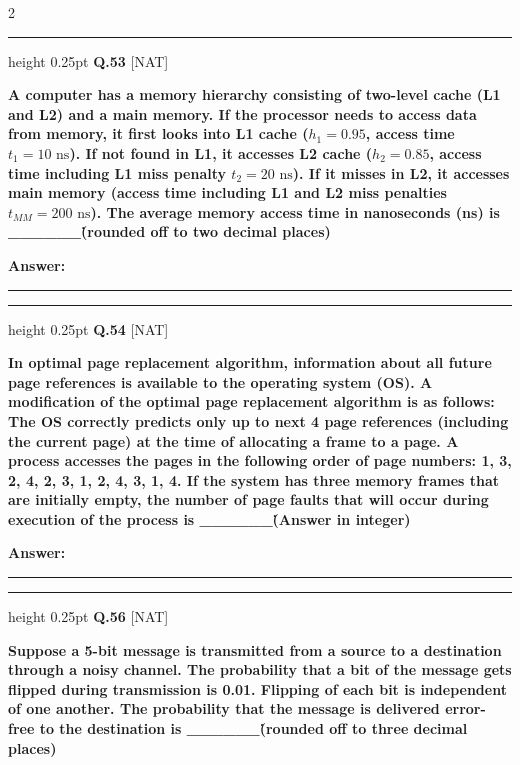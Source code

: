 \documentclass[a4paper,10pt,twoside]{article}
\begin{document}
\begin{multicols}{2}
\par\vspace{6pt}\hrule height 0.25pt\vspace{6pt}
\noindent\textbf{Q.53} \hfill {\footnotesize\textsf{[NAT]}}
\par\vspace{2pt}
{\bfseries A computer has a memory hierarchy consisting of two-level cache (L1 and L2) and a main memory. If the processor needs to access data from memory, it first looks into L1 cache ($h_1 = 0.95$, access time $t_1 = 10\text{ ns}$). If not found in L1, it accesses L2 cache ($h_2 = 0.85$, access time including L1 miss penalty $t_2 = 20\text{ ns}$). If it misses in L2, it accesses main memory (access time including L1 and L2 miss penalties $t_{MM} = 200\text{ ns}$). The average memory access time in nanoseconds (ns) is \_\_\_\_\_\_\. (rounded off to two decimal places) \par}
\par\vspace{3pt}\noindent\textbf{Answer:} \rule{3.2cm}{0.4pt}
\par\vspace{6pt}\hrule height 0.25pt\vspace{6pt}
\noindent\textbf{Q.54} \hfill {\footnotesize\textsf{[NAT]}}
\par\vspace{2pt}
{\bfseries In optimal page replacement algorithm, information about all future page references is available to the operating system (OS). A modification of the optimal page replacement algorithm is as follows:
The OS correctly predicts only up to next 4 page references (including the current page) at the time of allocating a frame to a page.
A process accesses the pages in the following order of page numbers:
1, 3, 2, 4, 2, 3, 1, 2, 4, 3, 1, 4.
If the system has three memory frames that are initially empty, the number of page faults that will occur during execution of the process is \_\_\_\_\_\_\. (Answer in integer) \par}
\par\vspace{3pt}\noindent\textbf{Answer:} \rule{3.2cm}{0.4pt}
\par\vspace{6pt}\hrule height 0.25pt\vspace{6pt}
\noindent\textbf{Q.56} \hfill {\footnotesize\textsf{[NAT]}}
\par\vspace{2pt}
{\bfseries Suppose a 5-bit message is transmitted from a source to a destination through a noisy channel. The probability that a bit of the message gets flipped during transmission is 0.01. Flipping of each bit is independent of one another. The probability that the message is delivered error-free to the destination is \_\_\_\_\_\_\. (rounded off to three decimal places) \par}

\end{multicols}
\end{document}
